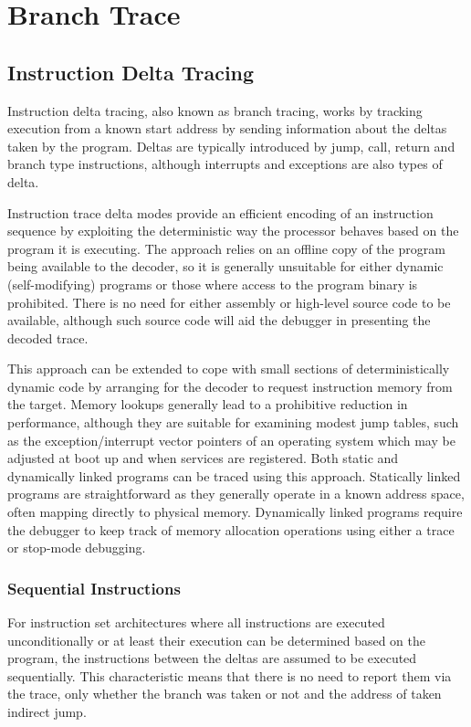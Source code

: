 \chapter{Branch Trace} \label{Branch Trace}


\section{Instruction Delta Tracing} \label{Delta Tracing}

Instruction delta tracing, also known as branch tracing, works by
tracking execution from a known start address by sending information
about the deltas taken by the program. Deltas are typically introduced
by jump, call, return and branch type instructions, although
interrupts and exceptions are also types of delta.

Instruction trace delta modes provide an efficient encoding of an
instruction sequence by exploiting the deterministic way the processor
behaves based on the program it is executing. The approach relies on
an offline copy of the program being available to the decoder, so it
is generally unsuitable for either dynamic (self-modifying) programs
or those where access to the program binary is prohibited. There is no
need for either assembly or high-level source code to be available,
although such source code will aid the debugger in presenting the
decoded trace.

This approach can be extended to cope with small sections of
deterministically dynamic code by arranging for the decoder to request
instruction memory from the target. Memory lookups generally lead to a
prohibitive reduction in performance, although they are suitable for
examining modest jump tables, such as the exception/interrupt vector
pointers of an operating system which may be adjusted at boot up and
when services are registered.  Both static and dynamically linked
programs can be traced using this approach. Statically linked programs
are straightforward as they generally operate in a known address
space, often mapping directly to physical memory. Dynamically linked
programs require the debugger to keep track of memory allocation
operations using either a trace or stop-mode debugging.

\subsection{Sequential Instructions} \label{Sequential Instructions}

For instruction set architectures where all instructions are executed
unconditionally or at least their execution can be determined based on
the program, the instructions between the deltas are assumed to be
executed sequentially. This characteristic means that there is no need
to report them via the trace, only whether the branch was taken or not
and the address of taken indirect jump.

